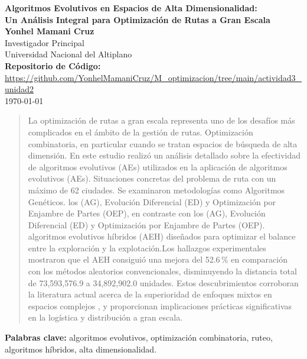 \documentclass[10pt,a4paper]{article}
\begin{document}
\begin{center}
\vspace*{2cm}
{\LARGE \textbf{Algoritmos Evolutivos en Espacios de Alta Dimensionalidad:}}\\[0.4em]
{\LARGE \textbf{Un Análisis Integral para Optimización de Rutas a Gran Escala}}\\[4em]
{\Large \textbf{Yonhel Mamani Cruz}}\\[0.5em]
Investigador Principal\\
Universidad Nacional del Altiplano\\[0.5em]
\textbf{Repositorio de Código:} \href{https://github.com/YonhelMamaniCruz/M_optimizacion/tree/main/actividad3_unidad2}{https://github.com/YonhelMamaniCruz/M_optimizacion/tree/main/actividad3_unidad2}\\[2em]
{\large \today}
\end{center}
\vspace{2em}
\begin{abstract}
La optimización de rutas a gran escala representa uno de los desafíos más complicados en el ámbito de la gestión de rutas.
 Optimización combinatoria, en particular cuando se tratan espacios de búsqueda de alta dimensión.  En
 este estudio realizó un análisis detallado sobre la efectividad de algoritmos evolutivos (AEs) utilizados en la aplicación de algoritmos evolutivos (AEs).
 Situaciones concretas del problema de ruta con un máximo de 62 ciudades.  Se examinaron metodologías como Algoritmos Genéticos.
 los (AG), Evolución Diferencial (ED) y Optimización por Enjambre de Partes (OEP), en contraste con los (AG), Evolución Diferencial (ED) y Optimización por Enjambre de Partes (OEP).
 algoritmos evolutivos híbridos (AEH) diseñados para optimizar el balance entre la exploración y la explotación.Los hallazgos experimentales mostraron que el AEH consiguió una mejora del 52.6\,\% en comparación con los métodos aleatorios convencionales, disminuyendo la distancia total de 73,593,576.9 a 34,892,902.0 unidades. Estos descubrimientos corroboran la literatura actual acerca de la superioridad de enfoques mixtos en espacios complejos \cite{talbi2002, sorensen2013}, y proporcionan implicaciones prácticas significativas en la logística y distribución a gran escala.
\end{abstract}


\vspace{1em}
\noindent\textbf{Palabras clave:} algoritmos evolutivos, optimización combinatoria, ruteo, algoritmos híbridos, alta dimensionalidad.
\end{document}
